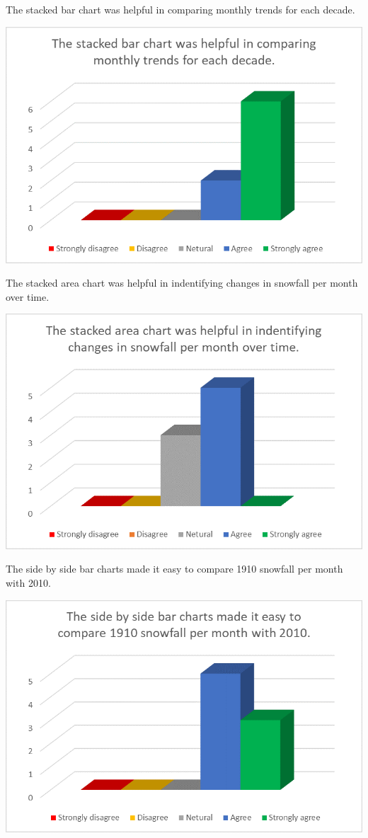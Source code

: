 \documentclass[]{article}
\begin{document}
The stacked bar chart was helpful in comparing monthly trends for each
decade.\\

\begin{center}\includegraphics[width=0.8\linewidth]{Ex2/figures/q7} \end{center}

The stacked area chart was helpful in indentifying changes in snowfall
per month over time.

\begin{center}\includegraphics[width=0.8\linewidth]{Ex2/figures/q8} \end{center}

The side by side bar charts made it easy to compare 1910 snowfall per
month with 2010.

\begin{center}\includegraphics[width=0.8\linewidth]{Ex2/figures/q9} \end{center}
\end{document}
